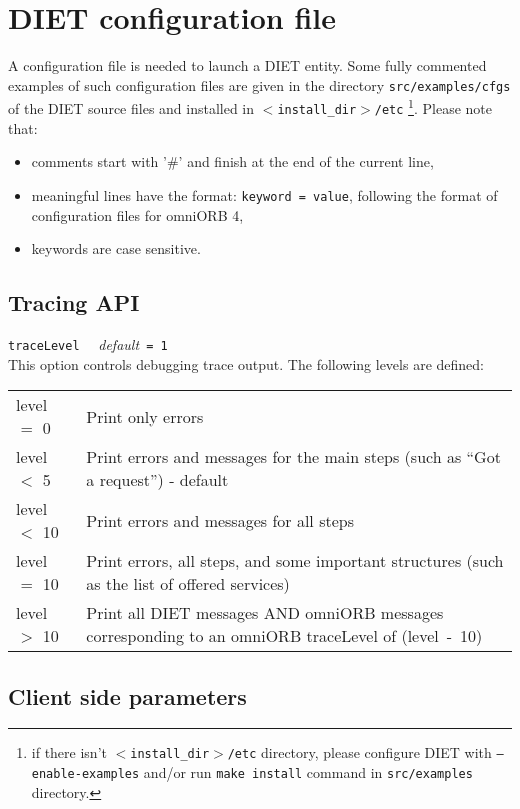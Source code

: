 \section{DIET configuration file} 
\label{sec:diet_config_files}

A configuration file is needed to launch a DIET entity. Some fully
commented examples of such configuration files are given in the
directory \texttt{src/examples/cfgs} of the DIET source files and
installed in \texttt{$<$install\_dir$>$/etc} \footnote{if there isn't
\texttt{$<$install\_dir$>$/etc} directory, please configure DIET with
\texttt{--enable-examples} and/or run \texttt{make install} command in
\texttt{src/examples} directory.}. Please note that:
\begin{itemize}
\item comments start with '\#' and finish at the end of the current
  line,
\item meaningful lines have the format: \texttt{keyword = value},
  following the format of configuration files for omniORB 4,
\item keywords are case sensitive.
\end{itemize}

\subsection{Tracing API}

\noindent
\texttt{traceLevel} \ \ \emph{default}\texttt{ = 1}\\
This option controls debugging trace output. The following levels are defined:

\begin{center}
 \footnotesize
 \begin{tabular}{p{.1\linewidth}p{.8\linewidth}}
  level $=$ 0  & Print only errors\\
  level $<$ 5  & Print errors and messages for the main steps (such as ``Got a
  request'') - default\\
  level $<$ 10 & Print errors and messages for all steps\\
  level $=$ 10 & Print errors, all steps, and some important structures (such
  as the list of offered services)\\
  level $>$ 10 & Print all DIET messages AND omniORB messages corresponding to
  an omniORB traceLevel of (level~-~10)
 \end{tabular}
\end{center}


\subsection{Client side parameters}

